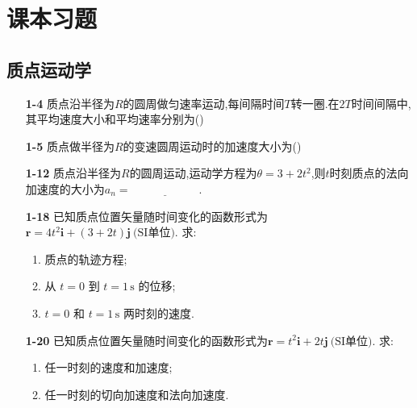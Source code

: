 \section{课本习题}
\subsection{质点运动学}

\begin{enumerate}

\item[\textbf{1-4}] 质点沿半径为$R$的圆周做匀速率运动,每间隔时间$T$转一圈.在$2T$时间间隔中,其平均速度大小和平均速率分别为(\quad)



\item[\textbf{1-5}] 质点做半径为$R$的变速圆周运动时的加速度大小为(\quad)




\item[\textbf{1-12}] 质点沿半径为$R$的圆周运动,运动学方程为$\theta  = 3 + 2t^2$,则$t$时刻质点的法向加速度的大小为$a_n = \underline{\hspace{6em}}.$


\item[\textbf{1-18}] 已知质点位置矢量随时间变化的函数形式为
$\mathbf{r}=4t^2\mathbf{i}+(3+2t)\mathbf{j}\ \text{(SI单位)}.$
求:
\begin{enumerate}
	\item 质点的轨迹方程;
	\item 从 \(t=0\) 到 \(t=1\,\text{s}\) 的位移;
	\item \(t=0\) 和 \(t=1\,\text{s}\) 两时刻的速度.
\end{enumerate}


\item[\textbf{1-20}] 已知质点位置矢量随时间变化的函数形式为$\mathbf{r}=t^2\mathbf{i}+2t\mathbf{j}\ \text{(SI单位)}.$
求:
\begin{enumerate}
	\item 任一时刻的速度和加速度;
	\item 任一时刻的切向加速度和法向加速度.
\end{enumerate}


\end{enumerate}
